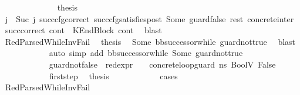 \begin{isabellebody}
\isanewline
\ \ \ \ \ \ \ \ \ \ \ \ \isamarkupfalse%
\ {\isacharquery}{\kern0pt}thesis\ \isamarkupfalse%
\ {\isacartoucheopen}j\ {\isacharequal}{\kern0pt}\ Suc\ j{\isacharprime}{\kern0pt}{\isacartoucheclose}\ succ{\isacharunderscore}{\kern0pt}cfg{\isacharunderscore}{\kern0pt}correct\ succ{\isacharunderscore}{\kern0pt}cfg{\isacharunderscore}{\kern0pt}satisfies{\isacharunderscore}{\kern0pt}post\ Some\ guard{\isacharunderscore}{\kern0pt}false\ rest\ concrete{\isacharunderscore}{\kern0pt}inter{}\ succ{\isacharunderscore}{\kern0pt}correct\ {\isacartoucheopen}cont{}\ {\isacharequal}{\kern0pt}\ KEndBlock\ cont{}{\isacartoucheclose}\ \isamarkupfalse%
\ blast\isanewline
\ \ \ \ \ \ \ \ \ \ \isamarkupfalse%
\isanewline
\ \ \ \ \ \ \ \ \ \ \ \ \isamarkupfalse%
\ RedParsedWhile{\isacharunderscore}{\kern0pt}InvFail\ \isamarkupfalse%
\ {\isacharquery}{\kern0pt}thesis\ \isamarkupfalse%
\ Some\ bb{\isacharunderscore}{\kern0pt}successor{\isacharunderscore}{\kern0pt}while\ guard{\isacharunderscore}{\kern0pt}not{\isacharunderscore}{\kern0pt}true\ \isamarkupfalse%
\ blast\isanewline
\ \ \ \ \ \ \ \ \ \ \isamarkupfalse%
\ {\isacharparenleft}{\kern0pt}auto\ simp\ add{\isacharcolon}{\kern0pt}\ bb{\isacharunderscore}{\kern0pt}successor{\isacharunderscore}{\kern0pt}while\ Some\ guard{\isacharunderscore}{\kern0pt}not{\isacharunderscore}{\kern0pt}true{\isacharparenright}{\kern0pt}\isanewline
\ \ \ \ \ \ \ \ \isamarkupfalse%
\isanewline
\ \ \ \ \ \ \ \ \ \ \isamarkupfalse%
\ guard{\isacharunderscore}{\kern0pt}not{\isacharunderscore}{\kern0pt}false{\isacharcolon}{\kern0pt}\ {\isachardoublequoteopen}{\isasymnot}\ {\isacharparenleft}{\kern0pt}red{\isacharunderscore}{\kern0pt}expr\ {\isasymLambda}\ {\isasymGamma}\ {\isasymOmega}\ concrete{\isacharunderscore}{\kern0pt}loop{\isacharunderscore}{\kern0pt}guard\ ns{}\ {\isacharparenleft}{\kern0pt}BoolV\ False{\isacharparenright}{\kern0pt}{\isacharparenright}{\kern0pt}{\isachardoublequoteclose}\isanewline
\ \ \ \ \ \ \ \ \ \ \isamarkupfalse%
\ first{\isacharunderscore}{\kern0pt}step\ \isamarkupfalse%
\ {\isacharquery}{\kern0pt}thesis\isanewline
\ \ \ \ \ \ \ \ \ \ \isamarkupfalse%
\ cases\isanewline
\ \ \ \ \ \ \ \ \ \ \ \ \isamarkupfalse%
\ RedParsedWhile{\isacharunderscore}{\kern0pt}InvFail\ \isamarkupfalse%

\end{isabellebody}
